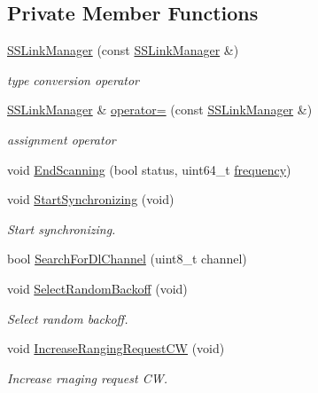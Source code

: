 \subsection*{Private Member Functions}
\begin{DoxyCompactItemize}
\item 
\hyperlink{classns3_1_1SSLinkManager_a33e58e9aa768d099271063f125a4ea54}{S\+S\+Link\+Manager} (const \hyperlink{classns3_1_1SSLinkManager}{S\+S\+Link\+Manager} \&)
\begin{DoxyCompactList}\small\item\em type conversion operator \end{DoxyCompactList}\item 
\hyperlink{classns3_1_1SSLinkManager}{S\+S\+Link\+Manager} \& \hyperlink{classns3_1_1SSLinkManager_a06093be400ca07cbab0872b5bf0dd439}{operator=} (const \hyperlink{classns3_1_1SSLinkManager}{S\+S\+Link\+Manager} \&)
\begin{DoxyCompactList}\small\item\em assignment operator \end{DoxyCompactList}\item 
void \hyperlink{classns3_1_1SSLinkManager_a302dfe1932eb44049069b7b12774f7ef}{End\+Scanning} (bool status, uint64\+\_\+t \hyperlink{mmwave_2model_2fading-traces_2fading__trace__generator_8m_a09045328d6d7e16aa4013f526cc6993d}{frequency})
\item 
void \hyperlink{classns3_1_1SSLinkManager_af0ae9ceec8f3d1c661724a06d8703871}{Start\+Synchronizing} (void)
\begin{DoxyCompactList}\small\item\em Start synchronizing. \end{DoxyCompactList}\item 
bool \hyperlink{classns3_1_1SSLinkManager_ac3abc88c99c2b650062d106b915cf476}{Search\+For\+Dl\+Channel} (uint8\+\_\+t channel)
\item 
void \hyperlink{classns3_1_1SSLinkManager_a769348cec247d05d7b2d51b45fba2743}{Select\+Random\+Backoff} (void)
\begin{DoxyCompactList}\small\item\em Select random backoff. \end{DoxyCompactList}\item 
void \hyperlink{classns3_1_1SSLinkManager_a65b4c7fff8954b4b7c8c41e3f9bdce3f}{Increase\+Ranging\+Request\+CW} (void)
\begin{DoxyCompactList}\small\item\em Increase rnaging request CW. \end{DoxyCompactList}\item 

\end{DoxyCompactItemize}
